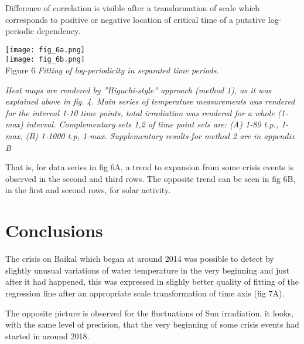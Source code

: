 \documentclass[a4paper]{article}
\begin{document}
\newpage

Difference of correlation is visible after a transformation of scale which corresponds to positive or negative location of critical time of a putative log-periodic dependency.

\vskip 12pt

\noindent
\texttt{[image: fig\_6a.png]}\\
\noindent
\texttt{[image: fig\_6b.png]}\\
Figure 6 \textit{Fitting of log-periodicity in separated time periods.}

\textit{\small{Heat maps are rendered by ''Higuchi-style'' approach (method 1), as it was explained above in fig. 4. Main series of temperature measurements was rendered for the interval 1-10 time points, total irradiation was rendered for a whole (1-max) interval. Complementary sets 1,2 of time point sets are: (A) 1-80 t.p., 1-max; (B) 1-1000 t.p, 1-max. Supplementary results for method 2 are in appendix B}}

\vskip 12pt
That is, for data series in fig 6A, a trend to expansion from some crisis events is observed in the second and third rows. The opposite trend can be seen in fig 6B, in the first and second rows, for solar activity. 

\newpage

\section*{Conclusions}

The crisis on Baikal which began at around 2014 was possible to detect by slightly unusual variations of water temperature in the very beginning and just after it had happened, this was expressed in slighly better quality of fitting of the regression line after an appropriate scale transformation of time axis (fig 7A). 

The opposite picture is observed for the fluctuations of Sun irradiation, it looks, with the same level of precision, that the very beginning of some crisis events had started in around 2018.


\end{document}
